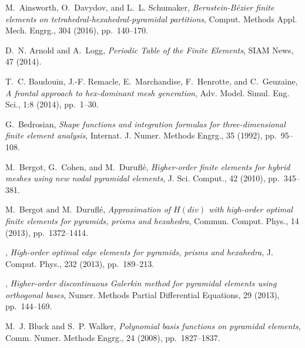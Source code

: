 \documentclass[twoside,reqno,final]{amsart}
\begin{document}

%
%


\begin{thebibliography}{10}

{\sc M.~Ainsworth, O.~Davydov, and L.~L. Schumaker}, {\em Bernstein-{B}\'ezier
  finite elements on tetrahedral-hexahedral-pyramidal partitions}, Comput.
  Methods Appl. Mech. Engrg., 304 (2016), pp.~140--170.

{\sc D.~N. Arnold and A.~Logg}, {\em Periodic {T}able of the {F}inite
  {E}lements}, SIAM {N}ews, 47 (2014).

{\sc T.~C. Baudouin, J.-F. Remacle, E.~Marchandise, F.~Henrotte, and
  C.~Geuzaine}, {\em A frontal approach to hex-dominant mesh generation}, Adv.
  Model. Simul. Eng. Sci., 1:8 (2014), pp.~1--30.

{\sc G.~Bedrosian}, {\em Shape functions and integration formulas for
  three-dimensional finite element analysis}, Internat. J. Numer. Methods
  Engrg., 35 (1992), pp.~95--108.

{\sc M.~Bergot, G.~Cohen, and M.~Durufl\'e}, {\em Higher-order finite elements
  for hybrid meshes using new nodal pyramidal elements}, J. Sci. Comput., 42
  (2010), pp.~345--381.

{\sc M.~Bergot and M.~Durufl\'e}, {\em Approximation of {$H(div)$} with
  high-order optimal finite elements for pyramids, prisms and hexahedra},
  Commun. Comput. Phys., 14 (2013), pp.~1372--1414.

\leavevmode\vrule height 2pt depth -1.6pt width 23pt, {\em High-order optimal
  edge elements for pyramids, prisms and hexahedra}, J. Comput. Phys., 232
  (2013), pp.~189--213.

\leavevmode\vrule height 2pt depth -1.6pt width 23pt, {\em Higher-order
  discontinuous {G}alerkin method for pyramidal elements using orthogonal
  bases}, Numer. Methods Partial Differential Equations, 29 (2013),
  pp.~144--169.

{\sc M.~J. Bluck and S.~P. Walker}, {\em Polynomial basis functions on
  pyramidal elements}, Comm. Numer. Methods Engrg., 24 (2008), pp.~1827--1837.


\end{thebibliography}
\end{document}
